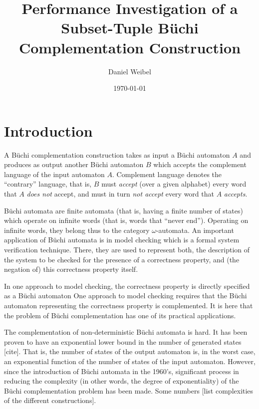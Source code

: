 \documentclass{scrreprt}
\newcommand{\om}{{$\omega$}}
\begin{document}
\title{Performance Investigation of a Subset-Tuple Büchi Complementation Construction}
\author{Daniel Weibel}
\date{\today}
\maketitle


\tableofcontents

\chapter{Introduction}

A Büchi complementation construction takes as input a Büchi automaton $A$ and produces as output another Büchi automaton $B$ which accepts the complement language of the input automaton $A$. Complement language denotes the ``contrary'' language, that is, $B$ must \emph{accept} (over a given alphabet) every word that $A$ \emph{does not} accept, and must in turn \emph{not accept} every word that $A$ \emph{accepts}.

Büchi automata are finite automata (that is, having a finite number of states) which operate on infinite words (that is, words that ``never end''). Operating on infinite words, they belong thus to the category \om-automata. An important application of Büchi automata is in model checking which is a formal system verification technique. There, they are used to represent both, the description of the system to be checked for the presence of a correctness property, and (the negation of) this correctness property itself.

In one approach to model checking, the correctness property is directly specified as a Büchi automaton
One approach to model checking requires that the Büchi automaton representing the correctness property is complemented. It is here that the problem of Büchi complementation has one of its practical applications. 

The complementation of non-deterministic Büchi automata is hard. It has been proven to have an exponential lower bound in the number of generated states [cite]. That is, the number of states of the output automaton is, in the worst case, an exponential function of the number of states of the input automaton. However, since the introduction of Büchi automata in the 1960's, significant process in reducing the complexity (in other words, the degree of exponentiality) of the Büchi complementation problem has been made. Some numbers [list complexities of the different constructions].
\end{document}
